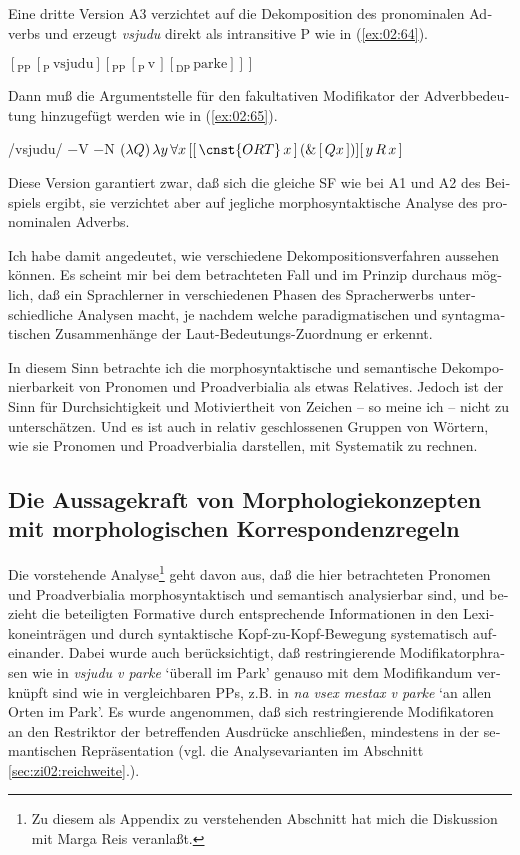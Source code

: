 \documentclass[output=paper, colorlinks, citecolor=brown, booklanguage=german]{langscibook}
\begin{document}
\begin{otherlanguage}{german}
Eine dritte Version A3 verzichtet auf die Dekomposition des pronominalen Adverbs und erzeugt \textit{vsjudu} direkt als intransitive P wie in (\ref{ex:02:64}).

\ea\label{ex:02:64} $[_\textrm{PP}\, [_\textrm{P}\, \textrm{vsjudu}] [_\textrm{PP}\, [_\textrm{P}\, \textrm{v}\,] [_\textrm{DP}\, \textrm{parke}]]]$ \z

\noindent Dann muß die Argumentstelle für den fakultativen Modifikator der Adverbbedeutung hinzugefügt werden wie in (\ref{ex:02:65}).

\ea\label{ex:02:65}
    \ea /vsjudu/
    \ex $-$V $-$N
    \ex $(\lambda Q)\, \lambda y\, \forall x\, [[\, \cnst{ORT}\, x \,]\, (\&\, [\, Q x \,])] [\, y\, R\, x \,]$
\z\z 

\noindent Diese Version garantiert zwar, daß sich die gleiche SF wie bei A1 und A2 des Beispiels ergibt, sie verzichtet aber auf jegliche morphosyntaktische Analyse des pronominalen Adverbs.

Ich habe damit angedeutet, wie verschiedene Dekompositionsverfahren aussehen können. Es scheint mir bei dem betrachteten Fall und im Prinzip durchaus möglich, daß ein Sprachlerner in verschiedenen Phasen des Spracherwerbs unterschiedliche Analysen macht, je nachdem welche paradigmatischen und syntagmatischen Zusammenhänge der Laut-Bedeutungs-Zuordnung er erkennt.

In diesem Sinn betrachte ich die morphosyntaktische und semantische Dekomponierbarkeit von Pronomen und Proadverbialia als etwas Relatives. Jedoch ist der Sinn für Durchsichtigkeit und Motiviertheit von Zeichen -- so meine ich -- nicht zu unterschätzen. Und es ist auch in relativ geschlossenen Gruppen von Wörtern, wie sie Pronomen und Proadverbialia darstellen, mit Systematik zu rechnen.
    
\subsection{Die Aussagekraft von Morphologiekonzepten mit morphologischen Korrespondenzregeln}\label{sec:zi02:alternative}

Die vorstehende Analyse\footnote{Zu diesem als Appendix zu verstehenden Abschnitt hat mich die Diskussion mit Marga Reis veranlaßt.} geht davon aus, daß die hier betrachteten Pronomen und Proadverbialia morphosyntaktisch und semantisch analysierbar sind, und bezieht die beteiligten Formative durch entsprechende Informationen in den Lexi\-kon\-ein\-trä\-gen und durch syntaktische Kopf-zu-Kopf-Bewegung systematisch auf\-ein\-an\-der. Dabei wurde auch berücksichtigt, daß restringierende Modi\-fi\-ka\-tor\-phra\-sen wie in \textit{vsjudu v parke} `überall im Park' genauso mit dem Modifikandum verknüpft sind wie in vergleichbaren PPs, z.B. in \textit{na vsex mestax v parke} `an allen Orten im Park'. Es wurde angenommen, daß sich restringierende Modifikatoren an den Restriktor der betreffenden Ausdrücke anschließen, mindestens in der semantischen Repräsentation (vgl. die Analysevarianten im Abschnitt \ref{sec:zi02:reichweite}.).


\end{otherlanguage}
\end{document}
